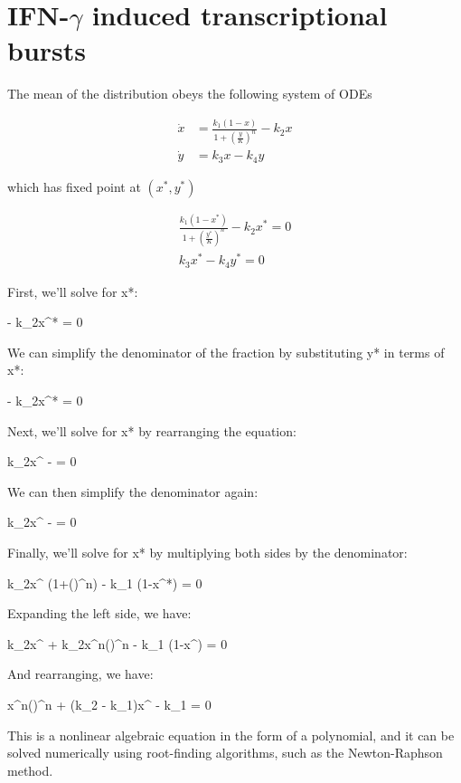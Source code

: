 \documentclass{ucetd}
\begin{document}
\chapter{IFN-$\gamma$ induced transcriptional bursts}

The mean of the distribution obeys the following system of ODEs

\begin{align*}
\dot{x} &= \frac{k_{1} (1-x)}{1+(\frac{y}{K})^{n}} - k_{2}x\\
\dot{y} &= k_{3} x - k_{4} y
\end{align*}

which has fixed point at $(x^{*},y^{*})$

\begin{align*}
\frac{k_{1} (1-x^{*})}{1+(\frac{y^{*}}{K})^{n}} - k_{2}x^{*} = 0\\
k_{3} x^{*} - k_{4} y^{*} = 0
\end{align*}

First, we'll solve for x*:

 - k_{2}x^{*} = 0

We can simplify the denominator of the fraction by substituting y* in terms of x*:

 - k_{2}x^{*} = 0

Next, we'll solve for x* by rearranging the equation:

k_{2}x^{} -  = 0

We can then simplify the denominator again:

k_{2}x^{} -  = 0

Finally, we'll solve for x* by multiplying both sides by the denominator:

k_{2}x^{} (1+()^{n}) - k_{1} (1-x^{*}) = 0

Expanding the left side, we have:

k_{2}x^{} + k_{2}x^{n}()^{n} - k_{1} (1-x^{}) = 0

And rearranging, we have:

x^{n}()^{n} + (k_{2} - k_{1})x^{} - k_{1} = 0

This is a nonlinear algebraic equation in the form of a polynomial, and it can be solved numerically using root-finding algorithms, such as the Newton-Raphson method.
\end{document}
